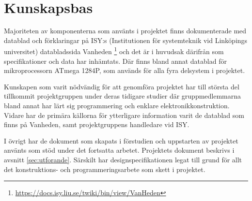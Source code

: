 


\section{Kunskapsbas}

Majoriteten av komponenterna som använts i projektet finns dokumenterade med datablad och förklaringar på ISY:s (Institutionen för systemteknik vid Linköpings universitet) databladssida Vanheden \footnote{\url{https://docs.isy.liu.se/twiki/bin/view/VanHeden}} och det är i huvudsak därifrån som specifikationer och data har inhämtats. Där finns bland annat datablad för mikroprocessorn ATmega 1284P, som används för alla fyra delsystem i projektet. 

Kunskapen som varit nödvändig för att genomföra projektet har till största del tillkommit projektgruppen under deras tidigare studier där gruppmedlemmarna bland annat har lärt sig programmering och enklare elektronikkonstruktion. Vidare har de primära källorna för ytterligare information varit de datablad som finns på Vanheden, samt projektgruppens handledare vid ISY. 

I övrigt har de dokument som skapats i förstudien och uppstarten av projektet använts som stöd under det fortsatta arbetet. Projektets dokument beskrivs i avsnitt \ref{sec:utforande}. Särskilt har designspecifikationen legat till grund för allt det konstruktions- och programmeringsarbete som skett i projektet.